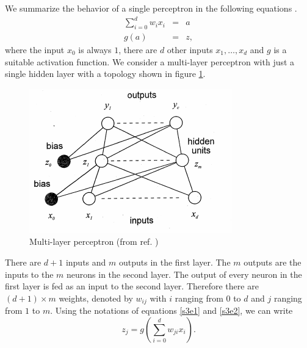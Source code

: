 \documentclass{article}
\numberwithin{equation}{section}
\begin{document}
We summarize the behavior of a single perceptron in the following
equations \cite{bishop1994neural}.
\begin{eqnarray}
\sum_{i=0}^d w_i x_i &=& a \label{s3e1} \\
g(a) &=& z \label{s3e2},
\end{eqnarray}
where the input $x_0$ is always $1$, there are $d$ other inputs $x_1, 
\ldots, x_d$ and $g$ is a suitable activation function. We consider a
multi-layer perceptron with just a single hidden layer with a topology
shown in figure \ref{f4}.
\begin{figure}[!ht]
\centering
\includegraphics[scale=0.8]{mlp}
\caption{Multi-layer perceptron (from ref. \cite{bishop1994neural})}
\label{f4}
\end{figure}
There are $d + 1$ inputs and $m$ outputs in the first layer. The $m$ 
outputs are the inputs to the $m$ neurons in the second layer. The output
of every neuron in the first layer is fed as an input to the second layer.
Therefore there are $(d + 1) \times m$ weights, denoted by $w_{ij}$ with
$i$ ranging from $0$ to $d$ and $j$ ranging from $1$ to $m$. Using the 
notations of equations \eqref{s3e1} and \eqref{s3e2}, we can write
\begin{equation}\label{s3e3}
z_j = g\left(\sum_{i=0}^d w_{ji}x_i\right).
\end{equation}



\end{document}
